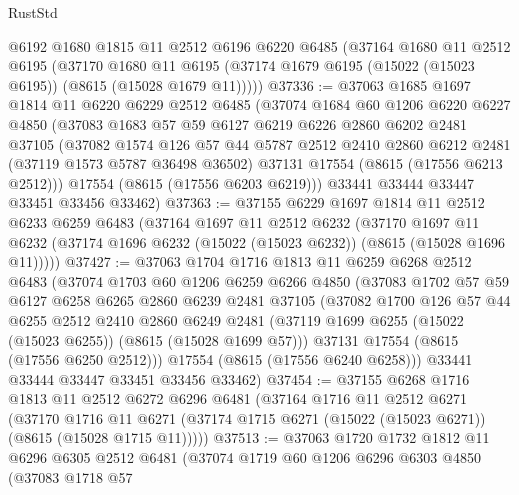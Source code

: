 \begin{lexlean}{RustStd}
\begin{coremodule}
    @6192
    @1680
    @1815
    @11
    @2512
    @6196
    @6220
    @6485
    (@37164
      @1680
      @11
      @2512
      @6195
      (@37170
        @1680
        @11
        @6195
        (@37174 @1679 @6195 (@15022 (@15023 @6195)) (@8615 (@15028 @1679 @11)))))
@37336 := @37063
    @1685
    @1697
    @1814
    @11
    @6220
    @6229
    @2512
    @6485
    (@37074
      @1684
      @60
      @1206
      @6220
      @6227
      @4850
      (@37083
        @1683
        @57
        @59
        @6127
        @6219
        @6226
        @2860
        @6202
        @2481
        @37105
        (@37082
          @1574
          @126
          @57
          @44
          @5787
          @2512
          @2410
          @2860
          @6212
          @2481
          (@37119 @1573 @5787 @36498 @36502)
          @37131
          @17554
          (@8615 (@17556 @6213 @2512)))
        @17554
        (@8615 (@17556 @6203 @6219)))
      @33441
      @33444
      @33447
      @33451
      @33456
      @33462)
@37363 := @37155
    @6229
    @1697
    @1814
    @11
    @2512
    @6233
    @6259
    @6483
    (@37164
      @1697
      @11
      @2512
      @6232
      (@37170
        @1697
        @11
        @6232
        (@37174 @1696 @6232 (@15022 (@15023 @6232)) (@8615 (@15028 @1696 @11)))))
@37427 := @37063
    @1704
    @1716
    @1813
    @11
    @6259
    @6268
    @2512
    @6483
    (@37074
      @1703
      @60
      @1206
      @6259
      @6266
      @4850
      (@37083
        @1702
        @57
        @59
        @6127
        @6258
        @6265
        @2860
        @6239
        @2481
        @37105
        (@37082
          @1700
          @126
          @57
          @44
          @6255
          @2512
          @2410
          @2860
          @6249
          @2481
          (@37119 @1699 @6255 (@15022 (@15023 @6255)) (@8615 (@15028 @1699 @57)))
          @37131
          @17554
          (@8615 (@17556 @6250 @2512)))
        @17554
        (@8615 (@17556 @6240 @6258)))
      @33441
      @33444
      @33447
      @33451
      @33456
      @33462)
@37454 := @37155
    @6268
    @1716
    @1813
    @11
    @2512
    @6272
    @6296
    @6481
    (@37164
      @1716
      @11
      @2512
      @6271
      (@37170
        @1716
        @11
        @6271
        (@37174 @1715 @6271 (@15022 (@15023 @6271)) (@8615 (@15028 @1715 @11)))))
@37513 := @37063
    @1720
    @1732
    @1812
    @11
    @6296
    @6305
    @2512
    @6481
    (@37074
      @1719
      @60
      @1206
      @6296
      @6303
      @4850
      (@37083
        @1718
        @57

\end{coremodule}
\end{lexlean}
